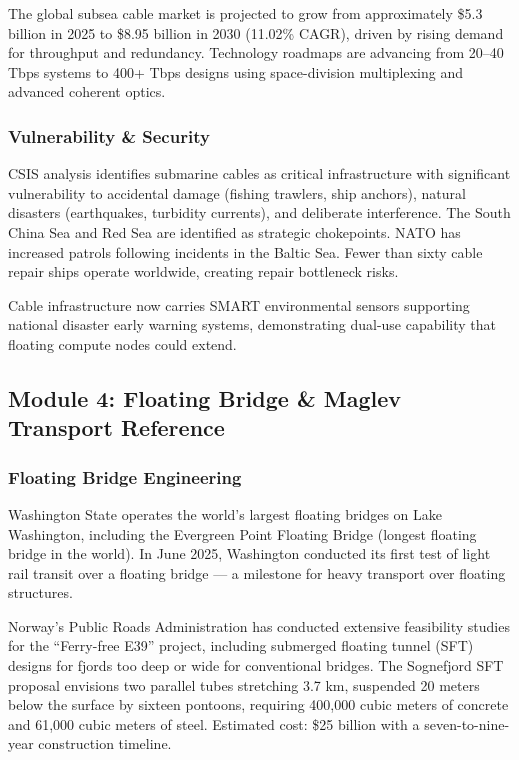 \documentclass[11pt,letterpaper]{article}
\begin{document}
The global subsea cable market is projected to grow from approximately \$5.3 billion in 2025 to \$8.95 billion in 2030 (11.02\% CAGR), driven by rising demand for throughput and redundancy. Technology roadmaps are advancing from 20--40 Tbps systems to 400+ Tbps designs using space-division multiplexing and advanced coherent optics.

\subsubsection{Vulnerability \& Security}

CSIS analysis identifies submarine cables as critical infrastructure with significant vulnerability to accidental damage (fishing trawlers, ship anchors), natural disasters (earthquakes, turbidity currents), and deliberate interference. The South China Sea and Red Sea are identified as strategic chokepoints. NATO has increased patrols following incidents in the Baltic Sea. Fewer than sixty cable repair ships operate worldwide, creating repair bottleneck risks.

Cable infrastructure now carries SMART environmental sensors supporting national disaster early warning systems, demonstrating dual-use capability that floating compute nodes could extend.

\subsection{Module 4: Floating Bridge \& Maglev Transport Reference}

\subsubsection{Floating Bridge Engineering}

Washington State operates the world's largest floating bridges on Lake Washington, including the Evergreen Point Floating Bridge (longest floating bridge in the world). In June 2025, Washington conducted its first test of light rail transit over a floating bridge --- a milestone for heavy transport over floating structures.

Norway's Public Roads Administration has conducted extensive feasibility studies for the ``Ferry-free E39'' project, including submerged floating tunnel (SFT) designs for fjords too deep or wide for conventional bridges. The Sognefjord SFT proposal envisions two parallel tubes stretching 3.7 km, suspended 20 meters below the surface by sixteen pontoons, requiring 400,000 cubic meters of concrete and 61,000 cubic meters of steel. Estimated cost: \$25 billion with a seven-to-nine-year construction timeline.
\end{document}
